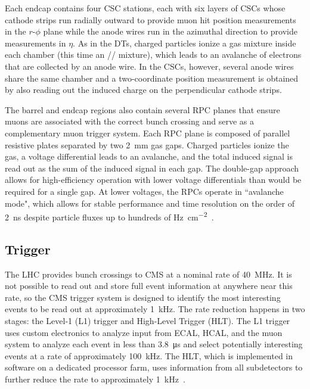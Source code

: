 Each endcap contains four CSC stations, each with six layers of CSCs whose cathode strips run radially outward to provide muon hit position measurements in the $r$-$\phi$ plane while the anode wires run in the azimuthal direction to provide measurements in $\eta$. As in the DTs, charged particles ionize a gas mixture inside each chamber (this time an // mixture), which leads to an avalanche of electrons that are collected by an anode wire. In the CSCs, however, several anode wires share the same chamber and a two-coordinate position measurement is obtained by also reading out the induced charge on the perpendicular cathode strips.

The barrel and endcap regions also contain several RPC planes that ensure muons are associated with the correct bunch crossing and serve as a complementary muon trigger system. Each RPC plane is composed of parallel resistive plates separated by two \SI{2}{\mm} gas gaps. Charged particles ionize the gas, a voltage differential leads to an avalanche, and the total induced signal is read out as the sum of the induced signal in each gap. The double-gap approach allows for high-efficiency operation with lower voltage differentials than would be required for a single gap. At lower voltages, the RPCs operate in ``avalanche mode", which allows for stable performance and time resolution on the order of \SI{2}{\ns} despite particle fluxes up to hundreds of \si{\Hz\per\cm\tothe{2}}~\cite{cms_experiment, pdg_2020, rpc_run2}.

\subsection{Trigger}
\label{trigger}
The LHC provides bunch crossings to CMS at a nominal rate of \SI{40}{\MHz}. It is not possible to read out and store full event information at anywhere near this rate, so the CMS trigger system is designed to identify the most interesting events to be read out at approximately \SI{1}{\kHz}. The rate reduction happens in two stages: the Level-1 (L1) trigger and High-Level Trigger (HLT). The L1 trigger uses custom electronics to analyze input from ECAL, HCAL, and the muon system to analyze each event in less than \SI{3.8}{\us} and select potentially interesting events at a rate of approximately \SI{100}{\kHz}. The HLT, which is implemented in software on a dedicated processor farm, uses information from all subdetectors to further reduce the rate to approximately \SI{1}{\kHz}~\cite{cms_experiment, trigger_run2}.


